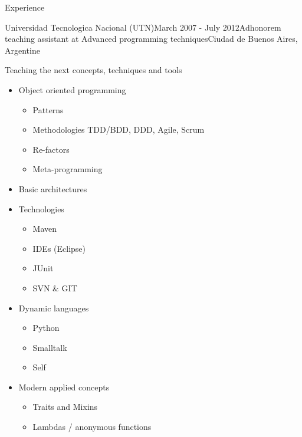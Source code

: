 \documentclass{resume} %
\begin{document}
\begin{rSection}{Experience}
\begin{rSubsection}{Universidad Tecnologica Nacional (UTN)}{March 2007 - July 2012}{Adhonorem teaching assistant at Advanced programming techniques}{Ciudad de Buenos Aires, Argentine}
\item Teaching the next concepts, techniques and tools
\begin{itemize}
	\item Object oriented programming
	\begin{itemize}
		\item Patterns
		\item Methodologies TDD/BDD, DDD, Agile, Scrum
		\item Re-factors
		\item Meta-programming
	\end{itemize}
	\item Basic architectures
	\item Technologies
	\begin{itemize}
		\item Maven 
		\item IDEs (Eclipse)
		\item JUnit
		\item SVN \& GIT
	\end{itemize}
	\item Dynamic languages 
	\begin{itemize}
		\item  Python
		\item  Smalltalk
		\item  Self
	\end{itemize}
	\item Modern applied concepts
	\begin{itemize}
		\item Traits and Mixins
		\item  Lambdas / anonymous functions
	\end{itemize}
\end{itemize}
\end{rSubsection}


\end{rSection}
\end{document}
